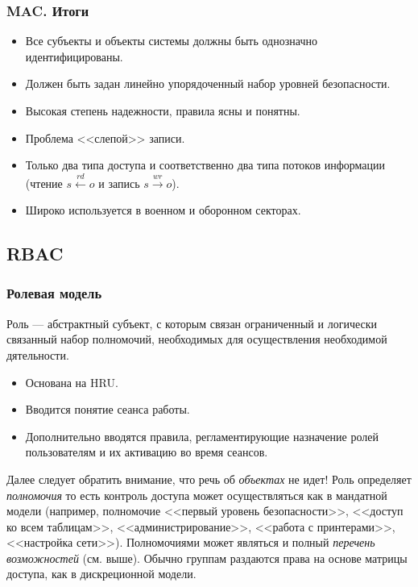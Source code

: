 \begin{frame}
    \frametitle{MAC. Итоги}
    \begin{itemize}
        \item Все субъекты и объекты системы должны быть однозначно идентифицированы.
        \item Должен быть задан линейно упорядоченный набор уровней безопасности.
        \item Высокая степень надежности, правила ясны и понятны.
        \item Проблема <<слепой>> записи.
        \item Только два типа доступа и соответственно два типа потоков информации (чтение $s\xleftarrow{rd}o$ и запись $s\xrightarrow{wr}o$).
        \item Широко используется в военном и оборонном секторах.
    \end{itemize}
\end{frame}


\subsection{RBAC}

\begin{frame}
    \frametitle{Ролевая модель}
    \begin{definition}
        \alert{Роль} --- абстрактный субъект, с которым связан ограниченный и логически связанный набор \alert{полномочий},
            необходимых для осуществления необходимой дятельности.
    \end{definition}

    \begin{itemize}
        \item Основана на HRU.
        \item Вводится понятие \alert{сеанса} работы.
        \item Дополнительно вводятся правила, регламентирующие назначение ролей пользователям и их активацию во время сеансов.
    \end{itemize}
\end{frame}


Далее следует обратить внимание, что речь об \emph{объектах} не идет! Роль определяет \emph{полномочия} то есть контроль доступа может осуществляться как в мандатной модели (например, полномочие <<первый уровень безопасности>>, <<доступ ко всем таблицам>>, <<администрирование>>, <<работа с принтерами>>, <<настройка сети>>). Полномочиями может являться и полный \emph{перечень возможностей} (см. выше). Обычно группам раздаются права на основе матрицы доступа, как в дискреционной модели.

